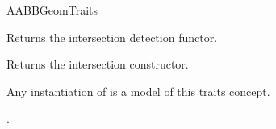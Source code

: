 \begin{ccRefConcept}{AABBGeomTraits}
\ccCreation
{}  %

\ccOperations

{Returns the intersection detection functor.}

{Returns the intersection constructor.}

\ccHasModels
Any instantiation of  is a model of this traits concept.

\ccSeeAlso

.

\end{ccRefConcept}

\ccRefPageEnd

